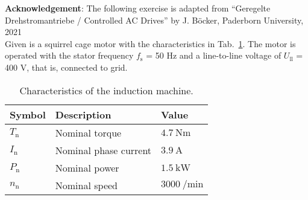 

\normalsize{\textbf{Acknowledgement}: The following exercise is adapted from ``Geregelte Drehstromantriebe / Controlled AC Drives'' by J. Böcker, Paderborn University, 2021
}\\





Given is a squirrel cage motor with the characteristics in Tab.~\ref{tab:characteristicsIM}. The motor is operated with the stator frequency $f_{\mathrm{s}}$ = 50 Hz and a line-to-line voltage of $U_{\mathrm{ll}}$ = 400 V, that is, connected to grid.

\begin{table}[htb]
    \caption{Characteristics of the induction machine.}
    \centering
    \begin{tabular}{lll}\toprule
    Symbol  & Description       & Value \\
    \midrule
    $T_{\mathrm{n}}$    & Nominal torque            & $\SI{4.7}{\newton\metre}$ \\
    $I_{\mathrm{n}}$    & Nominal phase current     & $\SI{3.9}{\ampere}$ \\
    $P_{\mathrm{n}}$    & Nominal power             & $\SI{1.5}{\kilo\watt}$ \\
    $n_{\mathrm{n}}$    & Nominal speed             & $\SI{3000}{\per\minute}$ \\
    \bottomrule
    \end{tabular}
    \label{tab:characteristicsIM}
\end{table}




